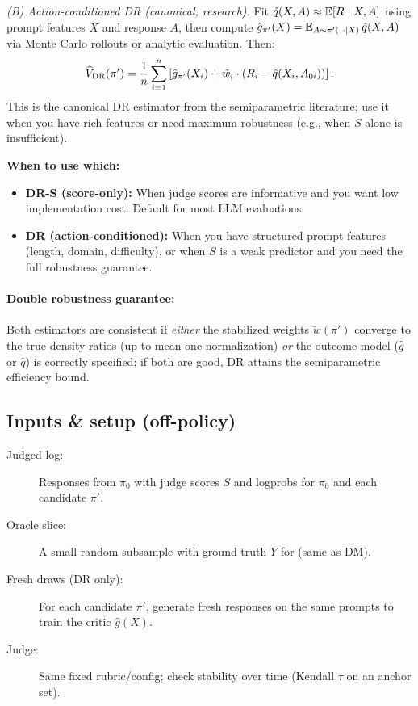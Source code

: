 \emph{(B) Action-conditioned DR (canonical, research).} Fit $\hat{q}(X,A) \approx \operatorname{\mathbb{E}}[R \mid X, A]$ using prompt features $X$ and response $A$, then compute $\hat{g}_{\pi'}(X) = \operatorname{\mathbb{E}}_{A \sim \pi'(\ \cdot \mid X)} \hat{q}(X, A)$ via Monte Carlo rollouts or analytic evaluation. Then:
\begin{equation}
\widehat{V}_{\text{DR}}(\pi') = \frac{1}{n} \sum_{i=1}^n \left[ \hat{g}_{\pi'}(X_i) + \tilde{w}_i \cdot (R_i - \hat{q}(X_i, A_{0i})) \right].
\end{equation}
This is the canonical DR estimator from the semiparametric literature; use it when you have rich features or need maximum robustness (e.g., when $S$ alone is insufficient).

\textbf{When to use which:}
\begin{itemize}
\item \textbf{DR-S (score-only):} When judge scores are informative and you want low implementation cost. Default for most LLM evaluations.
\item \textbf{DR (action-conditioned):} When you have structured prompt features (length, domain, difficulty), or when $S$ is a weak predictor and you need the full robustness guarantee.
\end{itemize}

\paragraph{Double robustness guarantee:} Both estimators are consistent if \emph{either} the stabilized weights $\tilde{w}(\pi')$ converge to the true density ratios (up to mean-one normalization) \emph{or} the outcome model ($\hat{g}$ or $\hat{q}$) is correctly specified; if both are good, DR attains the semiparametric efficiency bound.

\subsection{Inputs \& setup (off-policy)}

\begin{description}
\item[Judged log:] Responses from $\pi_0$ with judge scores $S$ and logprobs for $\pi_0$ and each candidate $\pi'$.
\item[Oracle slice:] A small random subsample with ground truth $Y$ for \autocal{} (same as DM).
\item[Fresh draws (DR only):] For each candidate $\pi'$, generate fresh responses on the same prompts to train the critic $\hat{g}(X)$.
\item[Judge:] Same fixed rubric/config; check stability over time (Kendall $\tau$ on an anchor set).
\end{description}

